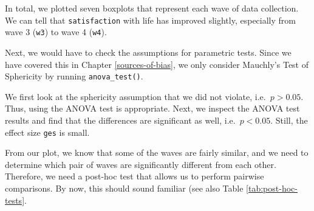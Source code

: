 \documentclass[
]{book}
\newenvironment{Shaded}{\begin{snugshade}}{\end{snugshade}}
\newcommand{\AttributeTok}[1]{\textcolor[rgb]{0.77,0.63,0.00}{#1}}
\newcommand{\CommentTok}[1]{\textcolor[rgb]{0.56,0.35,0.01}{\textit{#1}}}
\newcommand{\DocumentationTok}[1]{\textcolor[rgb]{0.56,0.35,0.01}{\textbf{\textit{#1}}}}
\newcommand{\FunctionTok}[1]{\textcolor[rgb]{0.00,0.00,0.00}{#1}}
\newcommand{\NormalTok}[1]{#1}
\newcommand{\SpecialCharTok}[1]{\textcolor[rgb]{0.00,0.00,0.00}{#1}}
\begin{document}
In total, we plotted seven boxplots that represent each wave of data collection. We can tell that \texttt{satisfaction} with life has improved slightly, especially from wave 3 (\texttt{w3}) to wave 4 (\texttt{w4}).

Next, we would have to check the assumptions for parametric tests. Since we have covered this in Chapter \ref{sources-of-bias}, we only consider Mauchly's Test of Sphericity by running \texttt{anova\_test()}.

\begin{Shaded}
\end{Shaded}

We first look at the sphericity assumption that we did not violate, i.e.~\(p > 0.05\). Thus, using the ANOVA test is appropriate. Next, we inspect the ANOVA test results and find that the differences are significant as well, i.e.~\(p < 0.05\). Still, the effect size \texttt{ges} is small.

From our plot, we know that some of the waves are fairly similar, and we need to determine which pair of waves are significantly different from each other. Therefore, we need a post-hoc test that allows us to perform pairwise comparisons. By now, this should sound familiar (see also Table \ref{tab:post-hoc-tests}.
\end{document}
